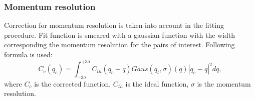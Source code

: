 \subsubsection{Momentum resolution}
Correction for momentum resolution is taken into account in the fitting procedure. Fit function is smeared with a gaussian function with the width corresponding the momentum resolution for the pairs of interest. Following formula is used:
\begin{equation}
C_c(q_c) = \int_{-3\sigma}^{+3\sigma}C_{th}(q_c-q) Gaus(q_t, \sigma)(q) |q_c-q|^2 d q,
\end{equation}
where $C_c$ is the corrected function, $C_{th}$ is the ideal function, $\sigma$ is the momentum resolution.


\begin{thebibliography}{99}

\end{thebibliography}
